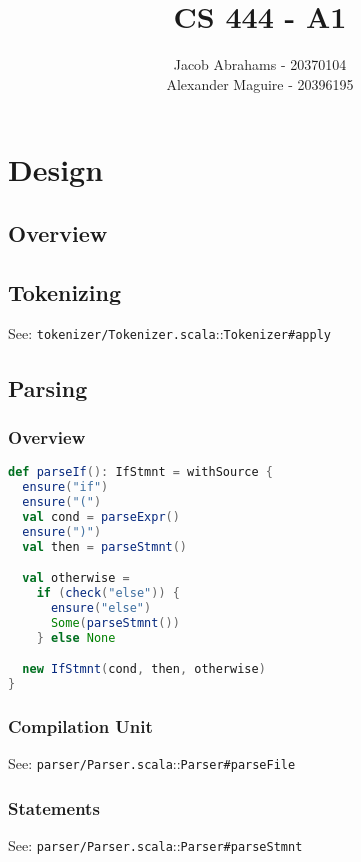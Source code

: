 \documentclass{article}
\title{CS 444 - A1}
\author{Jacob Abrahams - 20370104\\ Alexander Maguire - 20396195}
\begin{document}
\newcommand\type[1]{\texttt{#1}}
\renewcommand\value[1]{\texttt{#1}}
\newcommand\source[2]{See: \texttt{#1.scala}::\type{#2} \\}

\maketitle

\section{Design}


\subsection{Overview}


\subsection{Tokenizing}
\source{tokenizer/Tokenizer}{Tokenizer\#apply}




\subsection{Parsing}

\subsubsection{Overview}


\begin{lstlisting}[language=Scala]
def parseIf(): IfStmnt = withSource {
  ensure("if")
  ensure("(")
  val cond = parseExpr()
  ensure(")")
  val then = parseStmnt()

  val otherwise =
    if (check("else")) {
      ensure("else")
      Some(parseStmnt())
    } else None

  new IfStmnt(cond, then, otherwise)
}
\end{lstlisting}





\subsubsection{Compilation Unit}
\source{parser/Parser}{Parser\#parseFile}

\subsubsection{Statements}
\source{parser/Parser}{Parser\#parseStmnt}
\end{document}
